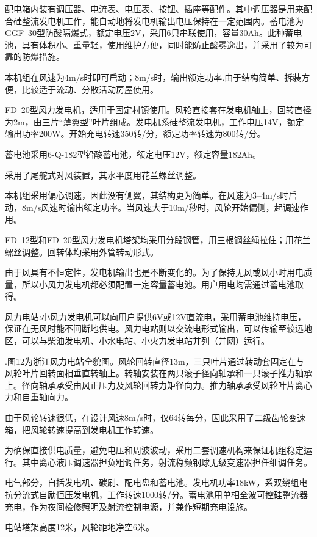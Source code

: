 \documentclass{ctexbook}
\begin{document}
配电箱内装有调压器、电流表、电压表、按钮、插座等配件。其中调压器是用来配合硅整流发电机工作，能自动地将发电机输出电压保持在一定范围内。蓄电池为GGF--30型防酸隔爆式，额定电压2V，采用6只串联使用，容量30Ah。此种蓄电池，具有体积小、重量轻，使用维护方便，同时能防止酸雾逸出，并采用了较为可靠的防爆措施。

本机组在风速为4m/s时即可启动；8m/s时，输出额定功率.由于结构简单、拆装方便，比较适于流动、分散活动房屋使用。

FD--20型风力发电机，适用于固定村镇使用。风轮直接套在发电机轴上，回转直径为2m，由三片“薄翼型”叶片组成。发电机系硅整流发电机，工作电压14V，额定输出功率200W。开始充电转速350转/分，额定功率转速为800转/分。

蓄电池采用6-Q-182型铅酸蓄电池，额定电压12V，额定容量182Ah。

采用了尾舵式对风装置，其水平度用花兰螺丝调整。

本机组采用偏心调速，因此没有侧翼，其结构更为简单。在风速为3--4m/s时启动，8m/s风速时输出额定功率。当风速大于10m/秒时，风轮开始偏侧，起调速作用。	

FD--12型和FD--20型风力发电机塔架均采用分段钢管，用三根钢丝绳拉住；用花兰螺丝调整。回转体均采用外管转动形式。

由于风具有不恒定性，发电机输出也是不断变化的。为了保持无风或风小时用电质量，所以小风力发电机都必须配置一定容量蓄电池。用户用电均需通过蓄电池取得。

风力电站:小风力发电机可以向用户提供6V或12V直流电，采用蓄电池维持电压，保证在无风时能不间断地供电。风力电站则以交流电形式输出，可以传输至较远地区，可以与柴油发电机、小水电站、小火力发电站并列（并网）运行。

.图12为浙江风力电站全貌图。风轮回转直径13m，三只叶片通过转动套固定在与风轮叶片回转面相垂直转轴上。转轴安装在两只滚子径向轴承和一只滚子推力轴承上。径向轴承承受由风正压力及风轮回转力矩径向力。推力轴承承受风轮叶片离心力和自重轴向力。

由于风轮转速很低，在设计风速8m/s时，仅64转每分，因此采用了二级齿轮变速箱，把风轮转速提高到发电机工作转速。

为确保直接供电质量，避免电压和周波波动，采用二套调速机构来保证机组稳定运行。其中离心液压调速器担负粗调任务，射流稳频钢球无级变速器担任细调任务。

电气部分，自括发电机、碳刷、配电盘和蓄电池。发电机功率18kW，系双绕组电抗分流式自励恒压发电机，工作转速1000转/分。蓄电池用单相全波可控硅整流器充电，作为夜间检修照明及射流控制电源，并兼作短期充电设施。

电站塔架高度12米，风轮距地净空6米。
\end{document}
